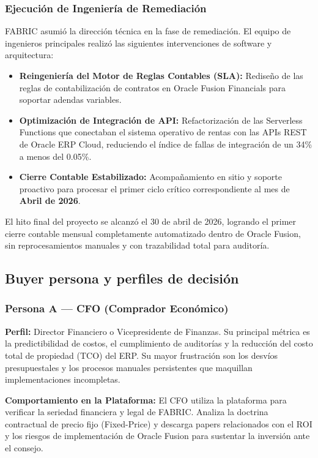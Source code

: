 \documentclass[11pt,letterpaper]{article}
\begin{document}
\subsubsection{Ejecución de Ingeniería de Remediación}
FABRIC asumió la dirección técnica en la fase de remediación. El equipo de ingenieros principales realizó las siguientes intervenciones de software y arquitectura:
\begin{itemize}
\item \textbf{Reingeniería del Motor de Reglas Contables (SLA):} Rediseño de las reglas de contabilización de contratos en Oracle Fusion Financials para soportar adendas variables.
\item \textbf{Optimización de Integración de API:} Refactorización de las Serverless Functions que conectaban el sistema operativo de rentas con las APIs REST de Oracle ERP Cloud, reduciendo el índice de fallas de integración de un 34\% a menos del 0.05\%.
\item \textbf{Cierre Contable Estabilizado:} Acompañamiento en sitio y soporte proactivo para procesar el primer ciclo crítico correspondiente al mes de \textbf{Abril de 2026}.
\end{itemize}
El hito final del proyecto se alcanzó el 30 de abril de 2026, logrando el primer cierre contable mensual completamente automatizado dentro de Oracle Fusion, sin reprocesamientos manuales y con trazabilidad total para auditoría.

\subsection{Buyer persona y perfiles de decisión}

\subsubsection{Persona A — CFO (Comprador Económico)}
\textbf{Perfil:} Director Financiero o Vicepresidente de Finanzas. Su principal métrica es la predictibilidad de costos, el cumplimiento de auditorías y la reducción del costo total de propiedad (TCO) del ERP. Su mayor frustración son los desvíos presupuestales y los procesos manuales persistentes que maquillan implementaciones incompletas.

\textbf{Comportamiento en la Plataforma:} El CFO utiliza la plataforma para verificar la seriedad financiera y legal de FABRIC. Analiza la doctrina contractual de precio fijo (Fixed-Price) y descarga papers relacionados con el ROI y los riesgos de implementación de Oracle Fusion para sustentar la inversión ante el consejo.
\end{document}
